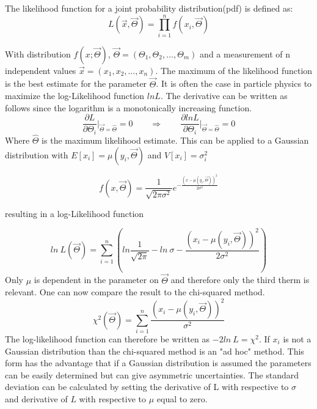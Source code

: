\documentclass[../Bachelorarbeit.tex]{subfiles}
\begin{document}
The likelihood function for a joint probability distribution(pdf) is defined as:
\begin{equation}
    L(\overrightarrow{x},\overrightarrow{\Theta}) = \prod_{i=1}^{n} f(x_{i},\overrightarrow{\Theta})
\end{equation}

With distribution $f(x;\overrightarrow{\Theta})$, $\overrightarrow{\Theta} = (\Theta_{1},\Theta_{2},\dots,\Theta_{m})$ and a measurement of n independent values $\overrightarrow{x}=(x_{1},x_{2},\dots,x_{n})$.
The maximum of the likelihood function is the best estimate for the parameter $\overrightarrow{\Theta}$.
It is often the case in particle physics to maximize the log-Likelihood function $ln L$. The derivative can be written as follows since the logarithm is a monotonically increasing function.
\begin{equation}
    \frac{\partial L}{\partial \Theta_{i}} \bigg \vert_{\overrightarrow{\Theta}=\hat{\Theta}} = 0 \qquad \Longrightarrow \qquad \frac{\partial ln L}{\partial \Theta_{i}} \bigg \vert_{\overrightarrow{\Theta}=\hat{\Theta}}=0
\end{equation}
Where $\hat{\Theta}$ is the maximum likelihood estimate. This can be applied to a Gaussian distribution with $E[x_{i}]=\mu(y_{i},\overrightarrow{\Theta})$ and $V[x_{i}]=\sigma_{i}^{2}$

\begin{equation}
    f(x,\overrightarrow{\Theta}) = \frac{1}{\sqrt{2\pi \sigma^{2}}} e^{-\frac{(x-\mu(y_{i},\overrightarrow{\Theta}))^{2}}{2 \sigma^{2}}}
\end{equation}

resulting in a log-Likelihood function

\begin{equation}
    ln \: L(\overrightarrow{\Theta}) = \sum^{n}_{i=1} \left( ln \frac{1}{\sqrt{2\pi}}-ln \: \sigma - \frac{(x_{i} - \mu(y_{i},\overrightarrow{\Theta}))^2}{2 \sigma^{2}}\right)
\end{equation}
Only $\mu$ is dependent in the parameter on $\overrightarrow{\Theta}$ and therefore only the third therm is relevant. One can now compare the result to the chi-squared method.
\begin{equation}
    \chi^{2}(\overrightarrow{\Theta}) = \sum^{n}_{i=1} \frac{(x_{i} - \mu(y_{i},\overrightarrow{\Theta}))^2}{\sigma^{2}}
\end{equation}
The log-likelihood function can therefore be written as $-2 ln \: L = \chi^{2}$. If $x_{i}$ is not a Gaussian distribution than the chi-squared method is an "ad hoc" method.
This form has the advantage that if a Gaussian distribution is assumed the parameters can be easily determined but can give asymmetric uncertainties.
The standard deviation can be calculated by setting the derivative of L with respective to $\sigma$ and derivative of $L$ with respective to $\mu$ equal to zero.
\end{document}
